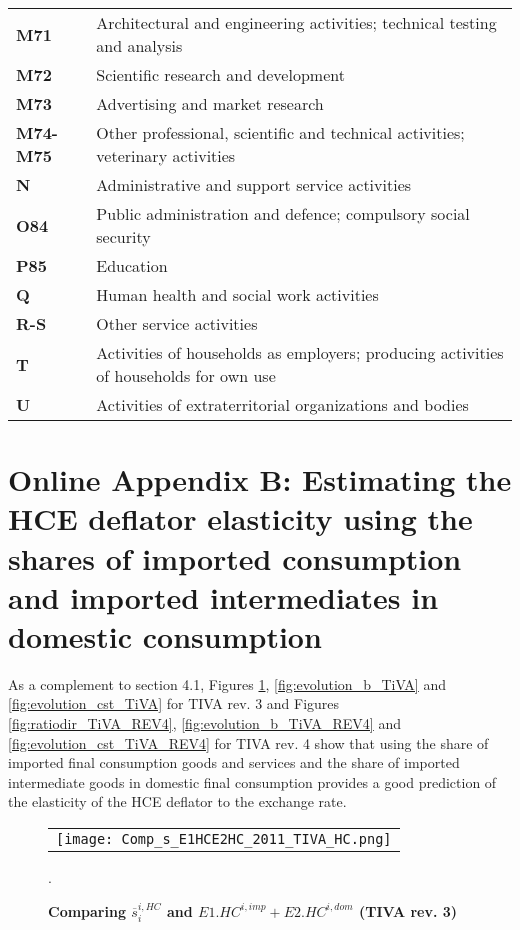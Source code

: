 \documentclass[12pt,a4paper]{article}
\begin{document}
\begin{table}[H]
\begin{tabular}{ll}
\textbf{M71} &{Architectural and engineering activities; technical testing and analysis}\\
\textbf{M72} &{Scientific research and development}\\
\textbf{M73} &{Advertising and market research}\\
\textbf{M74-M75} &{Other professional, scientific and technical activities; veterinary activities}\\
\textbf{N} &{Administrative and support service activities}\\
\textbf{O84} &{Public administration and defence; compulsory social security}\\
\textbf{P85} &{Education}\\
\textbf{Q} &{Human health and social work activities}\\
\textbf{R-S} &{Other service activities}\\
\textbf{T} &{Activities of households as employers; producing activities of households for own use}\\
\textbf{U} &{Activities of extraterritorial organizations and bodies}\\
  	\end{tabular}
\label{tab:wiodindustries}
\end{table}

\newpage
\section*{Online Appendix B: Estimating the HCE deflator elasticity using the shares of imported consumption and imported intermediates in domestic consumption} \label{AppendixFonctionLinéaireTIVA}

As a complement to section 4.1, Figures \ref{fig:ratiodir_TiVA}, \ref{fig:evolution_b_TiVA} and \ref{fig:evolution_cst_TiVA} for TIVA rev. 3 and Figures \ref{fig:ratiodir_TiVA_REV4}, \ref{fig:evolution_b_TiVA_REV4} and \ref{fig:evolution_cst_TiVA_REV4} for TIVA rev. 4 show that using the share of imported final consumption goods and services and the share of imported intermediate goods in domestic final consumption provides a good prediction of the elasticity of the HCE deflator to the exchange rate.


\begin{figure}[H]
	\centering
	\caption{\footnotesize{\textbf{Comparing $\overline{s}_{i}^{i,HC}$ and $E1.HC^{i,imp}+E2.HC^{i,dom}$ (TIVA rev. 3)}}}
	\begin{tabular}{c}
		\texttt{[image: Comp\_s\_E1HCE2HC\_2011\_TIVA\_HC.png]}\\
	\end{tabular}
	\label{fig:ratiodir_TiVA}
	.
\end{figure}
\end{document}
